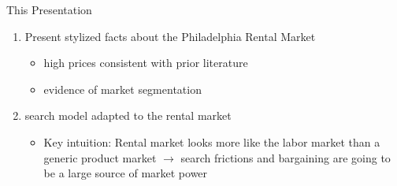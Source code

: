 \documentclass[10pt, xcolor=dvipsnames]{beamer}
\begin{document}
\begin{frame}{This Presentation}
    \begin{enumerate}
        \item Present stylized facts about the Philadelphia Rental Market
        \begin{itemize}
            \item high prices consistent with prior literature
            \item evidence of market segmentation
        \end{itemize}
         \pause
        \item \cite{jarosh-search-2024} search model adapted to the rental market
        \pause
        \begin{itemize}
            \item Key intuition: Rental market looks more like the labor market than a generic product market $\rightarrow$ search frictions and bargaining are going to be a large source of market power
        \end{itemize}
    \end{enumerate}
    
\end{frame}


    
\end{document}
